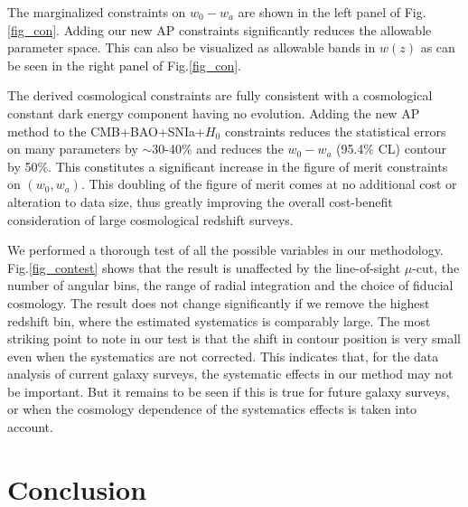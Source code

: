 \documentclass[iop]{emulateapj}
\begin{document}
The marginalized constraints on $w_0-w_a$ are shown in the left panel of Fig.\ref{fig_con}.
Adding our new AP constraints significantly reduces the allowable parameter space. 
This can also be visualized as allowable bands in $w(z)$ as can be seen in the right panel of Fig.\ref{fig_con}.  

The derived cosmological constraints are fully consistent with a cosmological constant dark energy component having no evolution.
Adding the new AP method to the CMB+BAO+SNIa+$H_0$ constraints reduces the statistical errors on many parameters by $\sim$30-40\% 
and reduces the $w_0-w_a$ (95.4\% CL) contour by 50\%.
This constitutes a significant increase in the figure of merit constraints on $(w_0, w_a)$. 
This doubling of the figure of merit comes at no additional cost or alteration to data size, 
thus greatly improving the overall cost-benefit consideration of large cosmological redshift surveys.


We performed a thorough test of all the possible variables in our methodology.
Fig.\ref{fig_contest} shows that 
the result is unaffected by the line-of-sight $\mu$-cut, 
the number of angular bins, 
the range of radial integration and the choice of fiducial cosmology. 
The result does not change significantly if we remove the highest redshift bin,
where the estimated systematics is comparably large.
The most striking point to note in our test is that the 
shift in contour position is very small even when %
the systematics are not corrected.
This indicates that, for the data analysis of current galaxy surveys,
the systematic effects in our method may not be important.
But it remains to be seen if this is true for future galaxy surveys,
or when the cosmology dependence of the systematics effects is taken into account.


\section{Conclusion}
\end{document}
